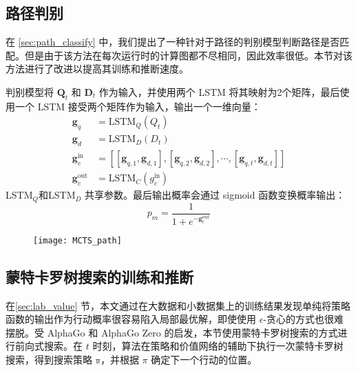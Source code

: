 \subsection{路径判别}
在 \ref{sec:path_classify} 中，我们提出了一种针对于路径的判别模型判断路径是否匹配。但是由于该方法在每次运行时的计算图都不尽相同，因此效率很低。本节对该方法进行了改进以提高其训练和推断速度。

判别模型将 $\mathbf{Q}_t$ 和 $\mathbf{D}_t$ 作为输入，并使用两个 LSTM 将其映射为2个矩阵，最后使用一个 LSTM 接受两个矩阵作为输入，输出一个一维向量：
$$
\begin{aligned}
\mathbf{g}_q &= \mathrm{LSTM}_Q(Q_t)\\
\mathbf{g}_d &= \mathrm{LSTM}_D(D_t)\\
\mathbf{g}_c^{\text{in}} &= [[\mathbf{g}_{q, 1}, \mathbf{g}_{d, 1}], [\mathbf{g}_{q, 2}, \mathbf{g}_{d, 2}], \cdots, [\mathbf{g}_{q, t}, \mathbf{g}_{d, t}]]\\
\mathbf{g}_c^{\text{out}} &= \mathrm{LSTM}_C({g}_c^{\text{in}})
\end{aligned}
$$
LSTM$_Q$和LSTM$_D$ 共享参数。最后输出概率会通过 sigmoid 函数变换概率输出：
\begin{equation}
\label{eq:classification_model}
p_m = \frac{1}{1+e^{-{\mathbf{g}_c^{\text{out}}}}}
\end{equation}

\begin{figure}[!htbp]
    \centering
    \texttt{[image: MCTS\_path]}
    \label{fig:MCTS_path}
\end{figure}

\subsection{蒙特卡罗树搜索的训练和推断}
在\ref{sec:lab_value} 节，本文通过在大数据和小数据集上的训练结果发现单纯将策略函数的输出作为行动概率很容易陷入局部最优解，即使使用 $\epsilon$-贪心的方式也很难摆脱。受 AlphaGo 和 AlphaGo Zero 的启发，本节使用蒙特卡罗树搜索的方式进行前向式搜索。在 $t$ 时刻，算法在策略和价值网络的辅助下执行一次蒙特卡罗树搜索，得到搜索策略 $\mathbb{\pi}$，并根据 $\pi$ 确定下一个行动的位置。

